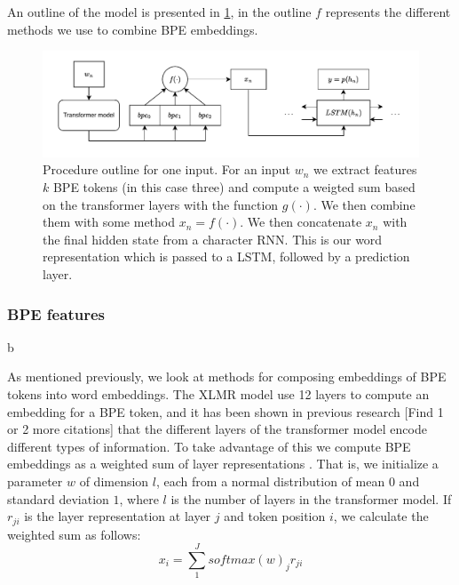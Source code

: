 \documentclass[11pt]{article}
\begin{document}
	An outline of the model is presented in \cref{fig:model}, in
        the outline $f$ represents the different methods we use to
        combine BPE embeddings.
	
	\begin{figure}%
		\centering
		\includegraphics[scale=0.5]{single_step.pdf}
    		\caption{\label{fig:model} Procedure outline for one
     input. For an input $w_n$ we extract features $k$ BPE tokens (in
     this case three) and compute a weigted sum based on the
     transformer layers with the function $g(\cdot)$. We then combine
     them with some method $x_n = f(\cdot)$. We then concatenate $x_n$
     with the final hidden state from a character RNN. This is our
     word representation which is passed to a LSTM, followed by a
     prediction layer.}
	\end{figure}
	
	\subsubsection{BPE features}b
        \label{sec:bpe-features}

             As mentioned previously, we look at methods for composing
     embeddings of BPE tokens into word embeddings. The XLMR model use
     12 layers to compute an embedding for a BPE token, and it has
     been shown in previous research
     \cite{kondratyukstraka,raganato2018analysis} [Find 1 or 2 more
     citations] that the different layers of the transformer model
     encode different types of information. To take advantage of this
     we compute BPE embeddings as a weighted sum of layer
     representations \cite{kondratyukstraka}.  That is, we initialize
     a parameter $w$ of dimension $l$, each from a normal distribution of mean $0$ and standard deviation $1$,
     where $l$ is the number of layers in the transformer model. If
     $r_{ji}$ is the layer representation at layer $j$ and token
     position $i$, we calculate the weighted sum as follows:
    \begin{equation}
		x_i = \sum_{1}^{J} softmax(w)_j r_{ji}
	\end{equation}
\end{document}

